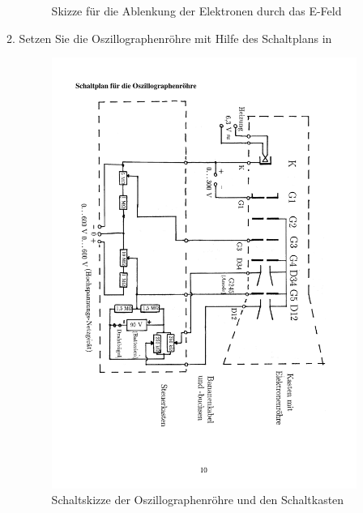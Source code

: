 \documentclass[12pt]{scrartcl}
\begin{document}
\begin{itemize}
\begin{enumerate}
\begin{figure}[htbp]
	  	\caption[Skizze für die Ablenkung der Elektronen durch das E-Feld]{Skizze für die Ablenkung der Elektronen durch das E-Feld\footnotemark}
	  \label{fig:E_ablenkung}
	\end{figure}
\item
Setzen Sie die Oszillographenröhre mit Hilfe des Schaltplans in 
\begin{figure}[htbp] 
	  \centering
	    \includegraphics[trim = 1mm 17mm 1mm 17mm, clip, scale = 0.5, angle =90]{schaltskizze.pdf}
	  	\caption[Schaltskizze der Oszillographenröhre und den Schaltkasten]{Schaltskizze der Oszillographenröhre und den Schaltkasten\footnotemark}
	  \label{fig:schaltskizze}
	\end{figure}
	\newpage

\end{enumerate}
\end{itemize}
\end{document}
